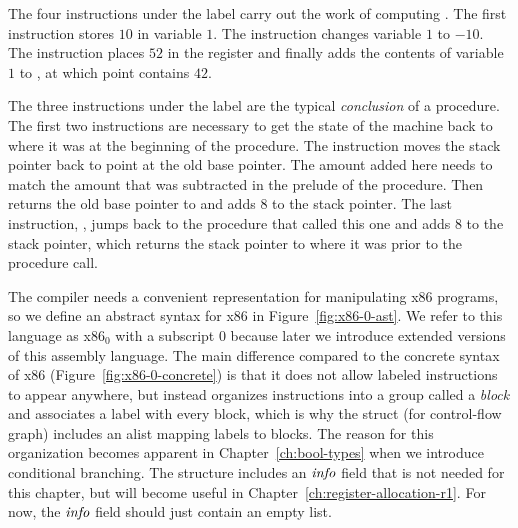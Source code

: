 \documentclass[11pt]{book}
\begin{document}
The four instructions under the label  carry out the work
of computing . The first instruction
 stores $10$ in variable $1$. The
instruction  changes variable $1$ to $-10$. The
instruction  places $52$ in the register  and
finally  adds the contents of variable $1$ to
, at which point  contains $42$.

The three instructions under the label  are the
typical \emph{conclusion} of a procedure.  The first
two instructions are necessary to get the state of the machine back to
where it was at the beginning of the procedure.  The instruction
 moves the stack pointer back to point at the
old base pointer. The amount added here needs to match the amount that
was subtracted in the prelude of the procedure. Then 
returns the old base pointer to  and adds $8$ to the stack
pointer.  The last instruction, , jumps back to the
procedure that called this one and adds 8 to the stack pointer, which
returns the stack pointer to where it was prior to the procedure call.

The compiler needs a convenient representation for manipulating x86
programs, so we define an abstract syntax for x86 in
Figure~\ref{fig:x86-0-ast}. We refer to this language as x86$_0$ with
a subscript $0$ because later we introduce extended versions of this
assembly language. The main difference compared to the concrete syntax
of x86 (Figure~\ref{fig:x86-0-concrete}) is that it does not allow
labeled instructions to appear anywhere, but instead organizes
instructions into a group called a \emph{block}
and associates a label with every block, which is why the  struct
(for control-flow graph) includes an alist mapping labels to
blocks. The reason for this organization becomes apparent in
Chapter~\ref{ch:bool-types} when we introduce conditional
branching. The  structure includes an $\mathit{info}$ field
that is not needed for this chapter, but will become useful in
Chapter~\ref{ch:register-allocation-r1}.  For now, the $\mathit{info}$
field should just contain an empty list.
\end{document}
